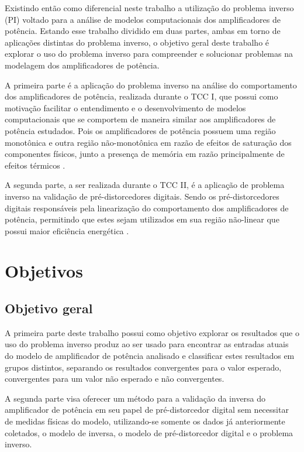 Existindo então como diferencial neste trabalho a utilização do problema inverso (PI) voltado para a análise de modelos computacionais dos amplificadores de potência. Estando esse trabalho dividido em duas partes, ambas em torno de aplicações distintas do problema inverso, o objetivo geral deste trabalho é explorar o uso do problema inverso para compreender e solucionar problemas na modelagem dos amplificadores de potência.

A primeira parte é a aplicação do problema inverso na análise do comportamento dos amplificadores de potência, realizada durante o TCC I, que possui como motivação facilitar o entendimento e o desenvolvimento de modelos computacionais que se comportem de maneira similar aos amplificadores de potência estudados. Pois os amplificadores de potência possuem uma região monotônica e outra região não-monotônica em razão de efeitos de saturação dos componentes físicos, junto a presença de memória em razão principalmente de efeitos térmicos \cite{pedro_comparative_2005}.

A segunda parte, a ser realizada durante o TCC II, é a aplicação de problema inverso na validação de pré-distorcedores digitais. Sendo os pré-distorcedores digitais responsáveis pela linearização do comportamento dos amplificadores de potência, permitindo que estes sejam utilizados em sua região não-linear que possui maior eficiência energética \cite{kenington_high-linearity_2000}.

\section{Objetivos} \label{sec:introd-obje}

\subsection{Objetivo geral} \label{ssec:introd-obje-geral}
A primeira parte deste trabalho possui como objetivo explorar os resultados que o uso do problema inverso produz ao ser usado para encontrar as entradas atuais do modelo de amplificador de potência analisado e classificar estes resultados em grupos distintos, separando os resultados convergentes para o valor esperado, convergentes para um valor não esperado e não convergentes.

A segunda parte visa oferecer um método para a validação da inversa do amplificador de potência em seu papel de pré-distorcedor digital sem necessitar de medidas físicas do modelo, utilizando-se somente os dados já anteriormente coletados, o modelo de inversa, o modelo de pré-distorcedor digital e o problema inverso.

